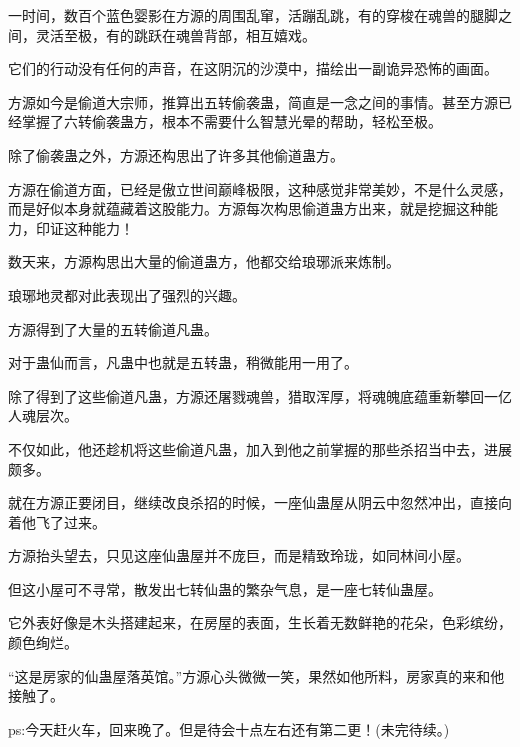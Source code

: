 \begin{this_body}
一时间，数百个蓝色婴影在方源的周围乱窜，活蹦乱跳，有的穿梭在魂兽的腿脚之间，灵活至极，有的跳跃在魂兽背部，相互嬉戏。

它们的行动没有任何的声音，在这阴沉的沙漠中，描绘出一副诡异恐怖的画面。

方源如今是偷道大宗师，推算出五转偷袭蛊，简直是一念之间的事情。甚至方源已经掌握了六转偷袭蛊方，根本不需要什么智慧光晕的帮助，轻松至极。

除了偷袭蛊之外，方源还构思出了许多其他偷道蛊方。

方源在偷道方面，已经是傲立世间巅峰极限，这种感觉非常美妙，不是什么灵感，而是好似本身就蕴藏着这股能力。方源每次构思偷道蛊方出来，就是挖掘这种能力，印证这种能力！

数天来，方源构思出大量的偷道蛊方，他都交给琅琊派来炼制。

琅琊地灵都对此表现出了强烈的兴趣。

方源得到了大量的五转偷道凡蛊。

对于蛊仙而言，凡蛊中也就是五转蛊，稍微能用一用了。

除了得到了这些偷道凡蛊，方源还屠戮魂兽，猎取浑厚，将魂魄底蕴重新攀回一亿人魂层次。

不仅如此，他还趁机将这些偷道凡蛊，加入到他之前掌握的那些杀招当中去，进展颇多。

就在方源正要闭目，继续改良杀招的时候，一座仙蛊屋从阴云中忽然冲出，直接向着他飞了过来。

方源抬头望去，只见这座仙蛊屋并不庞巨，而是精致玲珑，如同林间小屋。

但这小屋可不寻常，散发出七转仙蛊的繁杂气息，是一座七转仙蛊屋。

它外表好像是木头搭建起来，在房屋的表面，生长着无数鲜艳的花朵，色彩缤纷，颜色绚烂。

“这是房家的仙蛊屋落英馆。”方源心头微微一笑，果然如他所料，房家真的来和他接触了。

ps:今天赶火车，回来晚了。但是待会十点左右还有第二更！(未完待续。)

\end{this_body}

